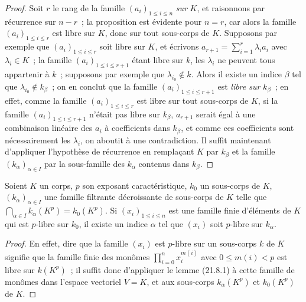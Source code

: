 \begin{proof}
Soit $r$ le rang de la famille $(a_i)_{1\leqslant i\leqslant n}$ \emph{sur} $K$, et
raisonnons par récurrence sur $n-r$~; la proposition est évidente pour $n=r$,
car alors la famille $(a_i)_{1\leqslant i\leqslant r}$ est libre sur $K$, donc
sur tout sous-corps de $K$. Supposons par exemple que
$(a_i)_{1\leqslant i\leqslant r}$ soit libre sur $K$, et écrivons
$a_{r+1}=\sum_{i=1}^r\lambda_i a_i$ avec $\lambda_i\in K$~; la famille
$(a_i)_{1\leqslant i\leqslant r+1}$ étant libre sur $k$, les $\lambda_i$ ne
peuvent tous appartenir à $k$~; supposons par exemple que
$\lambda_{i_0}\notin k$. Alors il existe un indice $\beta$ tel que
$\lambda_{i_0}\notin k_\beta$~; on en conclut que la famille $(a_i)_{1\leqslant i\leqslant r+1}$ est \emph{libre sur} $k_\beta$~; en effet, comme la
famille $(a_i)_{1\leqslant i\leqslant r}$ est libre sur tout sous-corps de
$K$, si la famille $(a_i)_{1\leqslant i\leqslant r+1}$ n'était pas libre sur
$k_\beta$, $a_{r+1}$ serait égal à une combinaison linéaire des $a_i$ à
coefficients dans $k_\beta$, et comme ces coefficients sont nécessairement
les $\lambda_i$, on aboutit à une contradiction. Il suffit maintenant
d'appliquer l'hypothèse de récurrence en remplaçant $K$ par $k_\beta$ et la
famille $(k_\alpha)_{\alpha\in I}$ par la sous-famille des $k_\alpha$
contenus dans $k_\beta$.
\end{proof}

\begin{lemma}[21.8.2]
\label{0.21.8.2-fr}
Soient $K$ un corps, $p$ son exposant caractéristique, $k_0$ un sous-corps de
$K$, $(k_\alpha)_{\alpha\in I}$ une famille filtrante décroissante de
sous-corps de $K$ telle que $\bigcap_{\alpha\in I}k_\alpha(K^p)=k_0(K^p)$.
Si $(x_i)_{1\leqslant i\leqslant n}$ est une famille finie d'éléments de $K$
qui est $p$-libre sur $k_0$, il existe un indice $\alpha$ tel que $(x_i)$ soit
$p$-libre sur $k_\alpha$.
\end{lemma}

\begin{proof}
En effet, dire que la famille $(x_i)$ est $p$-libre sur un sous-corps $k$
de $K$ signifie que la famille finie des monômes
$\prod_{i=0}^n x_i^{m(i)}$ avec $0\leqslant m(i)<p$ est libre sur $k(K^p)$~;
il suffit donc d'appliquer le lemme (21.8.1) à cette famille de monômes dans
l'espace vectoriel $V=K$, et aux sous-corps $k_\alpha(K^p)$ et $k_0(K^p)$
de $K$.
\end{proof}

